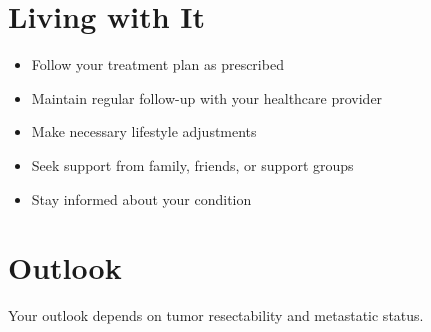 \section{Living with It}
\begin{itemize}[noitemsep]
  \item Follow your treatment plan as prescribed
  \item Maintain regular follow-up with your healthcare provider
  \item Make necessary lifestyle adjustments
  \item Seek support from family, friends, or support groups
  \item Stay informed about your condition
\end{itemize}
\section{Outlook}
Your outlook depends on tumor resectability and metastatic status.
